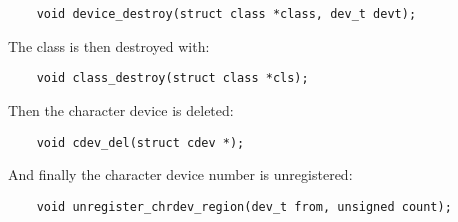 \begin{lstlisting}
	void device_destroy(struct class *class, dev_t devt);
\end{lstlisting}

The class is then destroyed with:

\begin{lstlisting}
	void class_destroy(struct class *cls);
\end{lstlisting}

Then the character device is deleted:

\begin{lstlisting}
	void cdev_del(struct cdev *);
\end{lstlisting}

And finally the character device number is unregistered:

\begin{lstlisting}
	void unregister_chrdev_region(dev_t	from, unsigned count);
\end{lstlisting}
